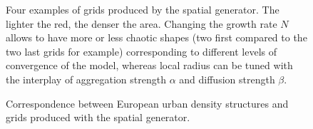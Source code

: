 \documentclass[Royal,sageh,times]{sagej}
\begin{document}
\begin{figure}[htbp] \begin{center} 
 \caption{Four examples of grids produced by the spatial generator. The lighter the red, the denser the area. Changing the growth rate $N$ allows to have more or less chaotic shapes (two first compared to the two last grids for example) corresponding to different levels of convergence of the model, whereas local radius can be tuned with the interplay of aggregation strength $\alpha$ and diffusion strength $\beta$.} \label{fig:spatialGen} \end{center} \end{figure} %

\begin{figure}[htbp] \begin{center} 
 \caption{Correspondence between European urban density structures and grids produced with the spatial generator.} 
\label{fig:densityTypes} \end{center} \end{figure} %
\end{document}
